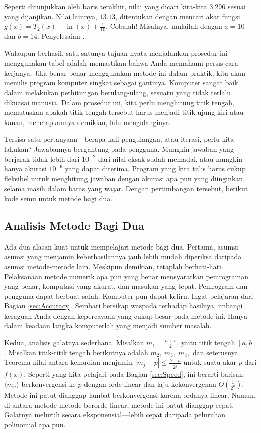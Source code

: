 Seperti ditunjukkan oleh baris terakhir, nilai yang dicari kira-kira
$3.296$ sesuai yang dijanjikan. Nilai lainnya, $13.13$, ditentukan
dengan mencari akar fungsi $g(x)=T_{2}(x)-\ln(x)+\frac{1}{10}$. Cobalah!
Misalnya, mulailah dengan $a=10$ dan $b=14$. Penyelesaian .

Walaupun berhasil, satu-satunya tujuan nyata menjalankan prosedur
ini menggunakan tabel adalah memastikan bahwa Anda memahami persis
cara kerjanya. Jika benar-benar menggunakan metode ini dalam praktik,
kita akan menulis program komputer singkat sebagai gantinya. Komputer
sangat baik dalam melakukan perhitungan berulang-ulang, sesuatu yang
tidak terlalu dikuasai manusia. Dalam prosedur ini, kita perlu menghitung
titik tengah, memutuskan apakah titik tengah tersebut harus menjadi
titik ujung kiri atau kanan, menetapkannya demikian, lalu mengulanginya. 

Tersisa satu pertanyaan---berapa kali pengulangan, atau iterasi,
perlu kita lakukan? Jawabannya bergantung pada pengguna. Mungkin jawaban
yang berjarak tidak lebih dari $10^{-2}$ dari nilai eksak sudah memadai,
atau mungkin hanya akurasi $10^{-6}$ yang dapat diterima. Program
yang kita tulis harus cukup fleksibel untuk menghitung jawaban dengan
akurasi apa pun yang diinginkan, selama masih dalam batas yang wajar.
Dengan pertimbangan tersebut, berikut kode semu untuk metode bagi
dua. 

\subsection{Analisis Metode Bagi Dua}

Ada dua alasan kuat untuk mempelajari metode bagi dua. Pertama, asumsi-asumsi
yang menjamin keberhasilannya jauh lebih mudah diperiksa daripada
asumsi metode-metode lain. Meskipun demikian, tetaplah berhati-hati.
Pelaksanaan metode numerik apa pun yang benar mensyaratkan pemrograman
yang benar, komputasi yang akurat, dan masukan yang tepat. Pemrogram
dan pengguna dapat berbuat salah. Komputer pun dapat keliru. Ingat
pelajaran dari Bagian \ref{sec:Accuracy}. Sembari bersikap waspada
terhadap hasilnya, imbangi keraguan Anda dengan kepercayaan yang cukup
besar pada metode ini. Hanya dalam keadaan langka komputerlah yang
menjadi sumber masalah.

Kedua, analisis galatnya sederhana. Misalkan $m_{1}=\frac{a+b}{2}$,
yaitu titik tengah $[a,b]$. Misalkan titik-titik tengah berikutnya
adalah $m_{2},\ m_{3},\ m_{4},$ dan seterusnya. Teorema nilai antara
kemudian menjamin $|m_{j}-p|\leq\frac{b-a}{2^{j}}$ untuk suatu akar
$p$ dari $f(x)$. Seperti yang kita pelajari pada Bagian \ref{sec:Speed},
ini berarti barisan $\langle m_{n}\rangle$ berkonvergensi ke $p$
dengan orde linear dan laju kekonvergenan $O\left(\frac{1}{2^{n}}\right)$.
Metode ini patut dianggap lambat berkonvergensi karena ordanya linear.
Namun, di antara metode-metode berorde linear, metode ini patut dianggap
cepat. Galatnya meluruh secara eksponensial---lebih cepat daripada
peluruhan polinomial apa pun.


